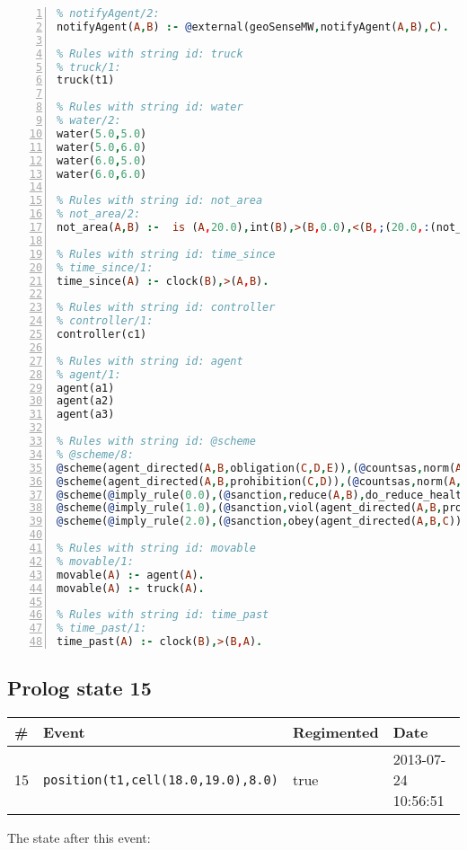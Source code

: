 \documentclass[11pt]{article}\usepackage[utf8]{inputenc}\usepackage{geometry}
\begin{document}
\begin{lstlisting}[language=Prolog, numbers=left]
% Rules with string id: notifyAgent
% notifyAgent/2:
notifyAgent(A,B) :- @external(geoSenseMW,notifyAgent(A,B),C).

% Rules with string id: truck
% truck/1:
truck(t1)

% Rules with string id: water
% water/2:
water(5.0,5.0)
water(5.0,6.0)
water(6.0,5.0)
water(6.0,6.0)

% Rules with string id: not_area
% not_area/2:
not_area(A,B) :-  is (A,20.0),int(B),>(B,0.0),<(B,;(20.0,:(not_area(A,B), is (-(B),20.0)))),int(A),>(A,0.0),<(A,;(20.0,:(area(A,B),-(int(A))))),int(B),>(A,0.0),>(B,0.0),<(A,21.0),<(B,21.0).

% Rules with string id: time_since
% time_since/1:
time_since(A) :- clock(B),>(A,B).

% Rules with string id: controller
% controller/1:
controller(c1)

% Rules with string id: agent
% agent/1:
agent(a1)
agent(a2)
agent(a3)

% Rules with string id: @scheme
% @scheme/8:
@scheme(agent_directed(A,B,obligation(C,D,E)),(@countsas,norm(A,B,F,obligation(C,D,E)),F),false,(listTrue(C)),(time_past(D)),false,[plus(viol(agent_directed(A,B,obligation(C,D,E))))|[]],[plus(obey(agent_directed(A,B,obligation(C,D,E))))|[]])
@scheme(agent_directed(A,B,prohibition(C,D)),(@countsas,norm(A,B,E,prohibition(C,D)),E),(listTrue(C)),false,(false),false,[plus(viol(agent_directed(A,B,prohibition(C,D))))|[]],[plus(obey(agent_directed(A,B,prohibition(C,D))))|[]])
@scheme(@imply_rule(0.0),(@sanction,reduce(A,B),do_reduce_health(A,B),notifyAgent(A,changed(status))),true,false,false,false,[min(reduce(A,B))|[]],[])
@scheme(@imply_rule(1.0),(@sanction,viol(agent_directed(A,B,prohibition(C,D))),do_sanction(D)),true,false,false,false,[min(viol(agent_directed(A,B,prohibition(C,D))))|[]],[])
@scheme(@imply_rule(2.0),(@sanction,obey(agent_directed(A,B,C))),true,false,false,false,[min(obey(agent_directed(A,B,C)))|[]],[])

% Rules with string id: movable
% movable/1:
movable(A) :- agent(A).
movable(A) :- truck(A).

% Rules with string id: time_past
% time_past/1:
time_past(A) :- clock(B),>(B,A).

\end{lstlisting}
\clearpage 
\subsection{Prolog state 15}
\begin{table}[ht]
\centering 
\begin{tabular}{l l l l} 
\textbf{\#} & \textbf{Event} & \textbf{Regimented} & \textbf{Date} \\ [0.5ex] 
\hline
15&\texttt{position(t1,cell(18.0,19.0),8.0)}&true&2013-07-24 10:56:51\\ [1ex] \hline\end{tabular}
\end{table}
The state after this event:
\end{document}

